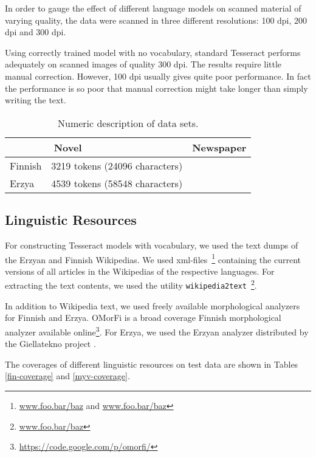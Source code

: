 \documentclass[b5paper]{article}
\begin{document}
In order to gauge the effect of different language models on scanned
material of varying quality, the data were scanned in three different
resolutions: 100 dpi, 200 dpi and 300 dpi.

Using correctly trained model with no vocabulary, standard Tesseract
performs adequately on scanned images of quality 300 dpi. The results
require little manual correction. However, 100 dpi usually gives quite
poor performance. In fact the performance is so poor that manual
correction might take longer than simply writing the text.

\begin{table}[!htb]
\begin{center}
\begin{tabular}{lrr}
\hline 
        & Novel~~~~~~~~~~~~~~~~~~   & Newspaper \\
\hline 
Finnish & 3219 tokens (24096 characters)  &          \\
Erzya   & 4539 tokens (58548 characters)  &          \\
\hline 
\end{tabular}
\caption{Numeric description of data sets.}\label{data-table}
\end{center}
\end{table}

\subsection{Linguistic Resources}
For constructing Tesseract models with vocabulary, we used the text
dumps of the Erzyan and Finnish Wikipedias. We used
xml-files~\footnote{\url{www.foo.bar/baz} and \url{www.foo.bar/baz}}
containing the current versions of all articles in the Wikipedias of
the respective languages. For extracting the text contents, we used
the utility {\tt wikipedia2text}~\footnote{\url{www.foo.bar/baz}}.

In addition to Wikipedia text, we used freely available morphological analyzers for Finnish and Erzya. OMorFi \cite{pirinen11} is a broad coverage Finnish morphological analyzer available online\footnote{\url{https://code.google.com/p/omorfi/}}. For Erzya, we used the Erzyan analyzer distributed by the Giellatekno project \cite{moshagen14}.

The coverages of different linguistic resources on test data are shown
in Tables \ref{fin-coverage} and \ref{myv-coverage}.
\end{document}
